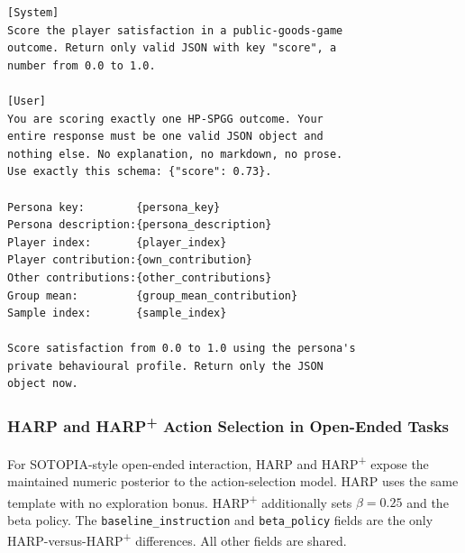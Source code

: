\begin{lstlisting}[style=prompt]
[System]
Score the player satisfaction in a public-goods-game
outcome. Return only valid JSON with key "score", a
number from 0.0 to 1.0.

[User]
You are scoring exactly one HP-SPGG outcome. Your
entire response must be one valid JSON object and
nothing else. No explanation, no markdown, no prose.
Use exactly this schema: {"score": 0.73}.

Persona key:        {persona_key}
Persona description:{persona_description}
Player index:       {player_index}
Player contribution:{own_contribution}
Other contributions:{other_contributions}
Group mean:         {group_mean_contribution}
Sample index:       {sample_index}

Score satisfaction from 0.0 to 1.0 using the persona's
private behavioural profile. Return only the JSON
object now.
\end{lstlisting}

\subsubsection{HARP and HARP\textsuperscript{+} Action Selection in Open-Ended Tasks}
\label{app:prompt-pact-sotopia}

For SOTOPIA-style open-ended interaction, HARP and HARP\textsuperscript{+} expose the maintained
numeric posterior to the action-selection model. HARP uses the same template
with no exploration bonus. HARP\textsuperscript{+} additionally sets $\beta = 0.25$ and the
beta policy. The \texttt{baseline\_instruction} and \texttt{beta\_policy} fields
are the only HARP-versus-HARP\textsuperscript{+} differences. All other fields are shared.

